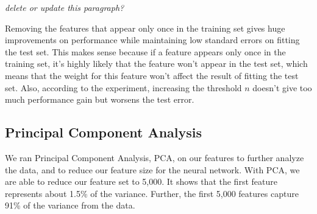 \documentclass[journal]{IEEEtran}
\begin{document}
\textit{delete or update this paragraph?}
\par Removing the features that
appear only once in the training set gives huge improvements on performance
while maintaining low standard errors on fitting the test set. This makes sense
because if a
feature appears only once in the training set, it's highly likely that the
feature won't appear in the test set, which means that the weight for this feature
won't affect the result of fitting the test set. Also, according to the experiment,
increasing the threshold $n$ doesn't give too much performance gain but worsens
the test error.

\subsection{Principal Component Analysis}
We ran Principal Component Analysis, PCA, on our features to further analyze
the data, and to reduce our feature size for the neural network. With PCA, we
are able to reduce our feature set to 5,000.  It shows that the first feature
represents about 1.5\% of the variance.  Further, the first 5,000 features
capture 91\% of the variance from the data.
\\
\\
\end{document}
